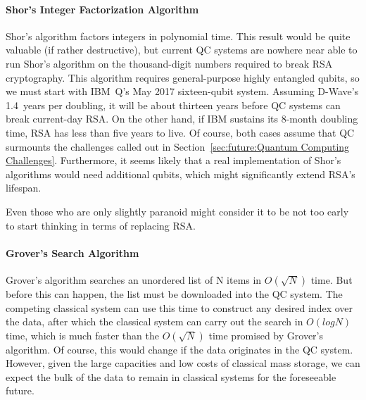 \paragraph{Shor's Integer Factorization Algorithm}
\label{sec:future:Shor's Integer Factorization Algorithm}

Shor's algorithm factors integers in polynomial time.
This result would be quite valuable (if rather destructive),
but current QC systems are nowhere near able to run
Shor's algorithm on the thousand-digit numbers required
to break RSA cryptography.
This algorithm requires general-purpose highly entangled qubits,
so we must start with IBM~Q's May 2017 sixteen-qubit system.
Assuming D-Wave's 1.4~years per doubling, it will be about thirteen
years before QC systems can break current-day RSA.
On the other hand, if IBM sustains its 8-month doubling time, RSA has
less than five years to live.
Of course, both cases assume that QC surmounts the challenges called
out in Section~\ref{sec:future:Quantum Computing Challenges}.
Furthermore, it seems likely that a real implementation of Shor's
algorithms would need additional qubits, which might significantly extend
RSA's lifespan.

Even those who are only slightly paranoid might consider it to be not
too early to start thinking in terms of replacing RSA.

\paragraph{Grover's Search Algorithm}
\label{sec:future:Grover's Search Algorithm}

Grover's algorithm searches an unordered list of N items
in $O(\sqrt N)$ time.
But before this can happen, the list must be downloaded into
the QC system.
The competing classical system can use this time to construct
any desired index over the data, after which the classical
system can carry out the search in $O(log N)$ time, which
is much faster than the $O(\sqrt N)$ time promised by
Grover's algorithm.
Of course, this would change if the data originates in the
QC system.
However, given the large capacities and low costs of
classical mass storage, we can expect the bulk of the data to remain
in classical systems for the foreseeable future.

